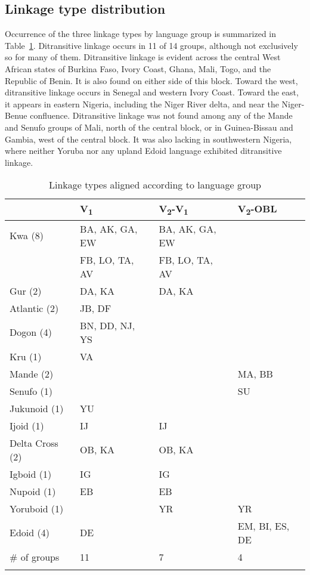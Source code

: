 \documentclass[output=paper,colorlinks,citecolor=brown]{langscibook}
\begin{document}
\subsection{Linkage type distribution}

Occurrence of the three linkage types by language group is summarized in Table~\ref{tab:LinkagebyGroup}. Ditransitive linkage occurs in 11 of 14 groups, although not exclusively so for many of them. Ditransitive linkage is evident across the central West African states of Burkina Faso, Ivory Coast, Ghana, Mali, Togo, and the Republic of Benin. It is also found on either side of this block. Toward the west, ditransitive linkage occurs in Senegal and western Ivory Coast. Toward the east, it appears in eastern Nigeria, including the Niger River delta, and near the Niger-Benue confluence. Ditransitive linkage was not found among any of the Mande and Senufo groups of Mali, north of the central block, or in Guinea-Bissau and Gambia, west of the central block. It was also lacking in southwestern Nigeria, where neither Yoruba nor any upland Edoid language exhibited ditransitive linkage.

\begin{table}
\caption{Linkage types aligned according to language group}
\label{tab:LinkagebyGroup}
 \begin{tabular}{llll}
  \lsptoprule
 & V\textsubscript{1} & V\textsubscript{2}-V\textsubscript{1} & V\textsubscript{2}-OBL  \\
\midrule
Kwa (8)	& BA, AK, GA, EW &	BA, AK, GA, EW	 & \\
& 	FB, LO, TA, AV &	FB, LO, TA, AV	 & \\
Gur (2) & 	DA, KA	&  DA, KA	& \\
Atlantic (2) & 	JB, DF		 & & \\
Dogon (4)	&BN, DD, NJ, YS&&\\		
Kru (1)	&VA		&& \\
Mande (2)	& & &		MA, BB\\
Senufo (1)	& & &		SU \\
Jukunoid (1) &	YU	 && \\
Ijoid (1) &	IJ&	IJ	& \\
Delta Cross (2)	& OB, KA& 	OB, KA	&\\
Igboid (1) &	IG	&IG	& \\
Nupoid (1)	& EB&	EB	& \\
Yoruboid (1)& &		YR	&YR\\
Edoid (4) &	DE	& &	EM, BI, ES, DE \\
\midrule
\# of groups &	11&	7&	4 \\
  \lspbottomrule
 \end{tabular}
\end{table}
\end{document}

